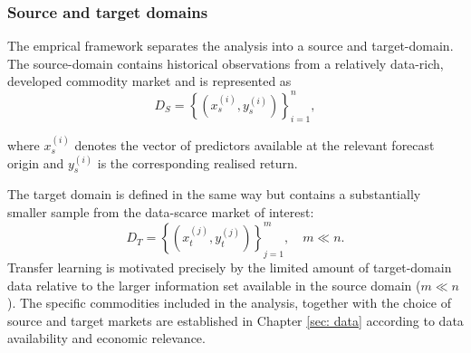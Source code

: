 \subsubsection{Source and target domains}
The emprical framework separates the analysis into a source and target-domain. The source-domain contains historical observations from a relatively data-rich, developed commodity market and is represented as
\begin{equation}
D_S=\left\{\left(x_s^{(i)}, y_s^{(i)}\right)\right\}_{i=1}^n,
\end{equation}

\noindent where $x_s^{(i)}$ denotes the vector of predictors available at the relevant forecast origin and $y_s^{(i)}$ is the corresponding realised return. 

The target domain is defined in the same way but contains a substantially smaller sample from the data-scarce market of interest:
\begin{equation}
D_T=\left\{\left(x_t^{(j)}, y_t^{(j)}\right)\right\}_{j=1}^m, \quad m \ll n .
\end{equation}
Transfer learning is motivated precisely by the limited amount of target-domain data relative to the larger information set available in the source domain ($m \ll n$). The specific commodities included in the analysis, together with the choice of source and target markets are established in Chapter \ref{sec: data} according to data availability and economic relevance. 

